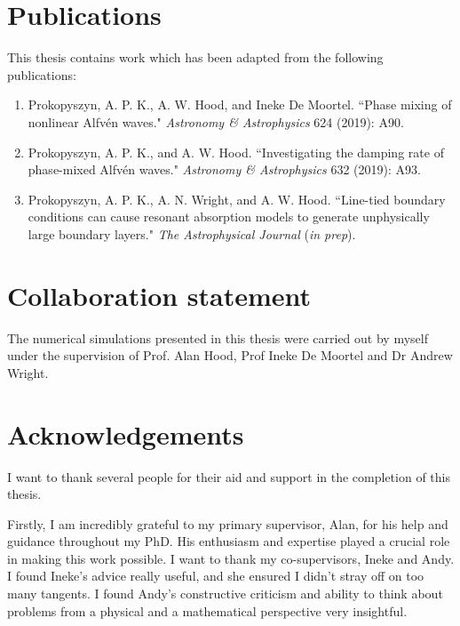 \documentclass[12pt,fleqn]{report}
\numberwithin{equation}{section}
\begin{document}
\newpage

\section*{Publications}

This thesis contains work which has been adapted from the following publications:

\begin{enumerate}
    \item Prokopyszyn, A. P. K., A. W. Hood, and Ineke De Moortel. ``Phase mixing of nonlinear Alfvén waves." \textit{Astronomy \& Astrophysics} 624 (2019): A90.
    \item Prokopyszyn, A. P. K., and A. W. Hood. ``Investigating the damping rate of phase-mixed Alfvén waves." \textit{Astronomy \& Astrophysics} 632 (2019): A93.
    \item Prokopyszyn, A. P. K., A. N. Wright, and A. W. Hood. ``Line-tied boundary conditions can cause resonant absorption models to generate unphysically large boundary layers." \textit{The Astrophysical Journal} (\textit{in prep}).
\end{enumerate}

\section*{Collaboration statement}

The numerical simulations presented in this thesis were carried out by myself under
the supervision of Prof. Alan Hood, Prof Ineke De Moortel and Dr Andrew Wright.

\newpage

\section*{Acknowledgements}

I want to thank several people for their aid and support in the completion of this thesis.

Firstly, I am incredibly grateful to my primary supervisor, Alan, for his help and guidance throughout my PhD. His enthusiasm and expertise played a crucial role in making this work possible. I want to thank my co-supervisors, Ineke and Andy. I found Ineke's advice really useful, and she ensured I didn't stray off on too many tangents. I found Andy's constructive criticism and ability to think about problems from a physical and a mathematical perspective very insightful.
\end{document}
